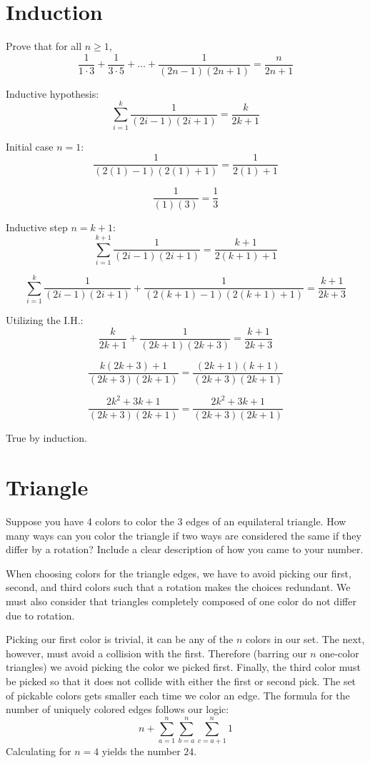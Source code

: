 \documentclass{article}
\begin{document}
\section{Induction}
Prove that for all $n \geq 1$,
\[
    \frac{1}{1 \cdot 3} +
    \frac{1}{3 \cdot 5} +
    \ldots +
    \frac{1}{(2n - 1)(2n + 1)} =
    \frac{n}{2n + 1}
\]

\bigskip

\noindent Inductive hypothesis:
\[
    \sum^k_{i = 1} \frac{1}{(2i - 1)(2i + 1)} =
    \frac{k}{2k + 1}
\]

\noindent Initial case $n = 1$:
\[
    \frac{1}{(2(1) - 1)(2(1) + 1)} =
    \frac{1}{2(1)+1}
\]

\[
    \frac{1}{(1)(3)} =
    \frac{1}{3}
\]

\medskip

\noindent Inductive step $n = k + 1$:
\[
    \sum^{k+1}_{i = 1} \frac{1}{(2i - 1)(2i + 1)} =
    \frac{k+1}{2(k + 1) + 1}
\]

\[
    \sum^{k}_{i = 1} \frac{1}{(2i - 1)(2i + 1)} +
    \frac{1}{(2(k + 1) - 1)(2(k + 1) + 1)} =
    \frac{k + 1}{2k + 3}
\]

\noindent Utilizing the I.H.:
\[
    \frac{k}{2k + 1} +
    \frac{1}{(2k + 1)(2k + 3)} =
    \frac{k + 1}{2k + 3}
\]

\[
    \frac{k(2k + 3) + 1}{(2k + 3)(2k + 1)} =
    \frac{(2k + 1)(k + 1)}{(2k + 3)(2k + 1)}
\]

\[
    \frac{2k^2 + 3k + 1}{(2k + 3)(2k + 1)} =
    \frac{2k^2 + 3k + 1}{(2k + 3)(2k + 1)}
\]

True by induction.

\pagebreak

\section{Triangle}
Suppose you have 4 colors to color the 3 edges of an equilateral triangle. How many ways can you color the triangle if two ways are considered the same if they differ by a rotation? Include a clear description of how you came to your number.

\bigskip

When choosing colors for the triangle edges, we have to avoid picking our first, second, and third colors such that a rotation makes the choices redundant. We must also consider that triangles completely composed of one color do not differ due to rotation.

Picking our first color is trivial, it can be any of the $n$ colors in our set. The next, however, must avoid a collision with the first. Therefore (barring our $n$ one-color triangles) we avoid picking the color we picked first. Finally, the third color must be picked so that it does not collide with either the first or second pick. The set of pickable colors gets smaller each time we color an edge. The formula for the number of uniquely colored edges follows our logic:
\[
    n + \sum^n_{a = 1} \sum^n_{b = a} \sum^n_{c = a + 1} 1
\]
Calculating for $n = 4$ yields the number $24$. 
\end{document}
